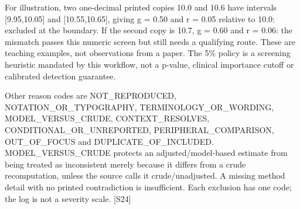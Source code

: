 \documentclass[10pt,a4paper]{article}
\begin{document}
For illustration, two one-\allowbreak{}decimal printed copies 10.\allowbreak{}0 and 10.\allowbreak{}6 have intervals [9.\allowbreak{}95,10.\allowbreak{}05] and [10.\allowbreak{}55,10.\allowbreak{}65], giving g = 0.\allowbreak{}50 and r = 0.\allowbreak{}05 relative to 10.\allowbreak{}0: excluded at the boundary.\allowbreak{} If the second copy is 10.\allowbreak{}7, g = 0.\allowbreak{}60 and r = 0.\allowbreak{}06: the mismatch passes this numeric screen but still needs a qualifying route.\allowbreak{} These are teaching examples, not observations from a paper.\allowbreak{} The 5\% policy is a screening heuristic mandated by this workflow, not a p-\allowbreak{}value, clinical importance cutoff or calibrated detection guarantee.\allowbreak{}\par
Other reason codes are NOT\_\allowbreak{}REPRODUCED, NOTATION\_\allowbreak{}OR\_\allowbreak{}TYPOGRAPHY, TERMINOLOGY\_\allowbreak{}OR\_\allowbreak{}WORDING, MODEL\_\allowbreak{}VERSUS\_\allowbreak{}CRUDE, CONTEXT\_\allowbreak{}RESOLVES, CONDITIONAL\_\allowbreak{}OR\_\allowbreak{}UNREPORTED, PERIPHERAL\_\allowbreak{}COMPARISON, OUT\_\allowbreak{}OF\_\allowbreak{}FOCUS and DUPLICATE\_\allowbreak{}OF\_\allowbreak{}INCLUDED.\allowbreak{} MODEL\_\allowbreak{}VERSUS\_\allowbreak{}CRUDE protects an adjusted/\allowbreak{}model-\allowbreak{}based estimate from being treated as inconsistent merely because it differs from a crude recomputation, unless the source calls it crude/\allowbreak{}unadjusted.\allowbreak{} A missing method detail with no printed contradiction is insufficient.\allowbreak{} Each exclusion has one code; the log is not a severity scale.\allowbreak{} [S24]\par
\end{document}
